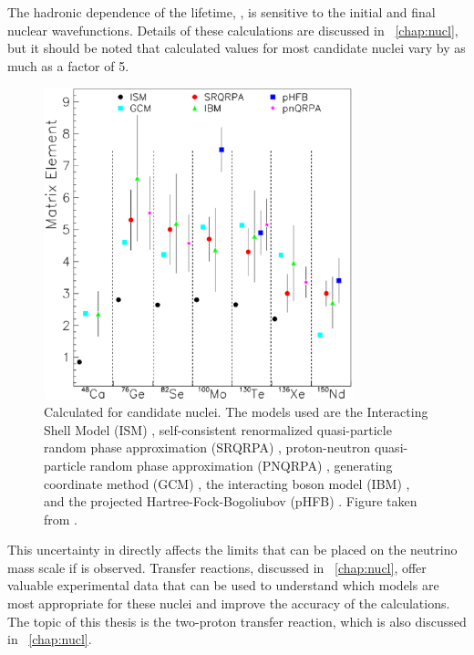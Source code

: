 The hadronic dependence of the lifetime, \NME, is sensitive to the initial and final nuclear wavefunctions.  Details of these calculations are discussed in {\chap}~\ref{chap:nucl}, but it should be noted that calculated \NME values for most candidate nuclei vary by as much as a factor of 5.
\begin{figure}[htp]
\centering
\includegraphics[width=0.8\textwidth]{figures/differentNME.eps}
\caption{Calculated \NME for candidate \zvbb nuclei.  The models used are the Interacting Shell Model (ISM) \cite{ISM}, self-consistent renormalized quasi-particle random phase approximation (SRQRPA) \cite{FaesslerReview}, proton-neutron quasi-particle random phase approximation (PNQRPA) \cite{pnQRPA_Suhonen}, generating coordinate method (GCM) \cite{GCM}, the interacting boson model (IBM) \cite{IBM_Iachello}, and the projected Hartree-Fock-Bogoliubov (pHFB) \cite{pHFB}.  Figure taken from \cite{zvbbReviewSchwingenheuer}.}
\label{fig:differentNME}
\end{figure}  
This uncertainty in \NME directly affects the limits that can be placed on the neutrino mass scale if \zvbb is observed.  Transfer reactions, discussed in {\chap}~\ref{chap:nucl}, offer valuable experimental data that can be used to understand which models are most appropriate for these nuclei and improve the accuracy of the calculations.  The topic of this thesis is the two-proton transfer reaction, which is also discussed in {\chap}~\ref{chap:nucl}.

